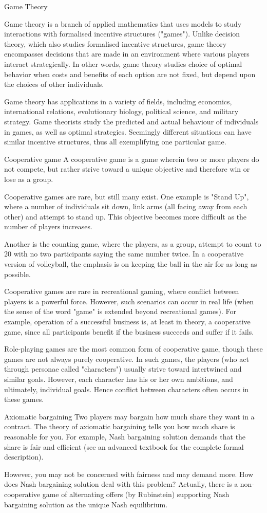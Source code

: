 
Game Theory

Game theory is a branch of applied mathematics that uses models to study interactions with formalised incentive structures ("games"). 
Unlike decision theory, which also studies formalised incentive structures, game theory encompasses decisions that are made in an environment where various players interact strategically.
In other words, game theory studies choice of optimal behavior when costs and benefits of each option are not fixed, but depend upon the choices of other individuals.

Game theory has applications in a variety of fields, including economics,  international relations, evolutionary biology, political science, and  military strategy. Game theorists study the predicted and actual  behaviour of individuals in games, as well as optimal strategies.  Seemingly different situations can have similar incentive  structures, thus all exemplifying one particular game. 

Cooperative game
A cooperative game is a game wherein two or more players do not compete, but rather strive toward a unique objective and therefore win or lose as a group.

Cooperative games are rare, but still many exist. One example is "Stand Up", where a number of individuals sit down, link arms (all facing away from each other) and attempt to stand up. This objective becomes more difficult as the number of players increases.

Another is the counting game, where the players, as a group, attempt to count to 20 with no two participants saying the same number twice. In a cooperative version of volleyball, the emphasis is on keeping the ball in the air for as long as possible.

Cooperative games are rare in recreational gaming, where conflict between players is a powerful force. However, such scenarios can occur in real life (when the sense of the word "game" is extended beyond recreational games). For example, operation of a successful business is, at least in theory, a cooperative game, since all participants benefit if the business succeeds and suffer if it fails.

Role-playing games are the most common form of cooperative game, though these games are not always purely cooperative. In such games, the players (who act through personae called "characters") usually strive toward intertwined and similar goals. However, each character has his or her own ambitions, and ultimately, individual goals. Hence conflict between characters often occurs in these games.

Axiomatic bargaining
Two players may bargain how much share they want in a contract. The theory of axiomatic bargaining tells you how much share is reasonable for you. For example, Nash bargaining solution demands that the share is fair and efficient (see an advanced textbook for the complete formal description).

However, you may not be concerned with fairness and may demand more. How does Nash bargaining solution deal with this problem? Actually, there is a non-cooperative game of alternating offers (by Rubinstein) supporting Nash bargaining solution as the unique Nash equilibrium.


